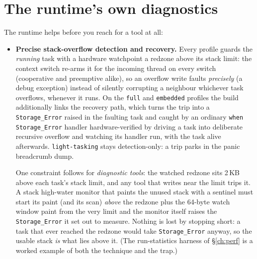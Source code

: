 \section{The runtime's own diagnostics}

The runtime helps before you reach for a tool at all:

\begin{itemize}
  \item \textbf{Precise stack-overflow detection \textemdash{} and recovery.}
        Every profile guards the \emph{running} task with a hardware
        watchpoint a redzone above its stack limit: the context switch
        re-arms it for the incoming thread on every switch (cooperative and
        preemptive alike), so an overflow write faults \emph{precisely} (a
        debug exception) instead of silently corrupting a neighbour \textemdash{}
        whichever task overflows, whenever it runs.  On the \texttt{full} and \texttt{embedded} profiles the
        build additionally links the recovery path, which turns the trip into
        a \texttt{Storage\_Error} raised in the faulting task and caught by
        an ordinary \texttt{when Storage\_Error} handler \textemdash{}
        hardware-verified by driving a task into deliberate recursive overflow
        and watching its handler run, with the task alive afterwards.
        \texttt{light-tasking} stays detection-only: a trip parks in the
        panic breadcrumb dump.

        One constraint follows for \emph{diagnostic tools}: the watched
        redzone sits 2\,KB above each task's stack limit, and any tool that
        writes near the limit trips it.  A stack high-water monitor that
        paints the unused stack with a sentinel must start its paint (and its
        scan) \emph{above} the redzone plus the 64-byte watch window \textemdash{}
        paint from the very limit and the monitor itself raises the
        \texttt{Storage\_Error} it set out to measure.  Nothing is lost by
        stopping short: a task that ever reached the redzone would take
        \texttt{Storage\_Error} anyway, so the usable stack \emph{is} what
        lies above it.  (The run-statistics harness of \S\ref{ch:perf} is a
        worked example of both the technique and the trap.)


\end{itemize}
